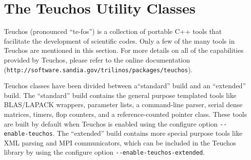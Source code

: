 % 
% 
% 
%   
%   
% 
% 

\section{The Teuchos Utility Classes}
\label{chap:teuchos}

Teuchos (pronounced ``te-fos'') is a collection of portable C++ tools
that facilitate the development of scientific codes.  Only a few of the many
tools in Teuchos are mentioned in this section.
For more details on all of the capabilities provided by Teuchos, please 
refer to the online documentation (\verb!http://software.sandia.gov/trilinos/packages/teuchos!).

Teuchos classes have been divided between a``standard'' build and an
``extended'' build. The ``standard'' build contains the general purpose
templated tools like BLAS/LAPACK wrappers, parameter lists, a command-line parser,
serial dense matrices, timers, flop counters, and a reference-counted pointer class.  
These tools are built by default when Teuchos is enabled using the 
configure option \verb!--enable-teuchos!. 
The ``extended'' build contains more special purpose tools like 
XML parsing and MPI communicators, which can be included in the Teuchos
library by using the configure option \verb!--enable-teuchos-extended!.

\medskip

